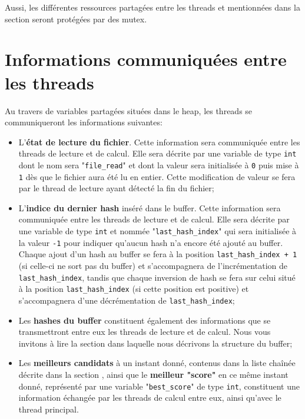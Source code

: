 \documentclass{article}
\begin{document}
	Aussi, les différentes ressources partagées entre les threads et mentionnées dans la section \textit{} seront protégées par des mutex.
 
\section{Informations communiquées entre les threads}
\label{sec:shared_data}
\noindent
	Au travers de variables partagées situées dans le heap, les threads se communiqueront les informations suivantes:
	
	\begin{itemize}
		\item
		L'\textbf{état de lecture du fichier}.
		Cette information sera communiquée entre les threads de lecture et de calcul.
		Elle sera décrite par une variable de type \lstinline{int} dont le nom sera "\lstinline{file_read}" et dont la valeur sera initialisée à \lstinline{0} puis mise à \lstinline{1} dès que le fichier aura été lu en entier.
		Cette modification de valeur se fera par le thread de lecture ayant détecté la fin du fichier;
		
		\item
		L'\textbf{indice du dernier hash} inséré dans le buffer.
		Cette information sera communiquée entre les threads de lecture et de calcul.
		Elle sera décrite par une variable de type \lstinline{int} et nommée "\lstinline{last_hash_index}" qui sera initialisée à la valeur \lstinline{-1} pour indiquer qu'aucun hash n'a encore été ajouté au buffer.
		Chaque ajout d'un hash au buffer se fera à la position \lstinline{last_hash_index + 1} (si celle-ci ne sort pas du buffer) et s'accompagnera de l'incrémentation de \lstinline{last_hash_index}, tandis que chaque inversion de hash se fera sur celui situé à la position \lstinline{last_hash_index} (si cette position est positive) et s'accompagnera d'une décrémentation de \lstinline{last_hash_index};
		
		\item 
		Les \textbf{hashes du buffer} constituent également des informations que se transmettront entre eux les threads de lecture et de calcul. Nous vous invitons à lire la section \textit{} dans laquelle nous décrivons la structure du buffer;
		
		\item
		Les \textbf{meilleurs candidats} à un instant donné, contenus dans la liste chaînée décrite dans la section \textit{}, ainsi que le \textbf{meilleur "score"} en ce même instant donné, représenté par une variable "\lstinline{best_score}" de type \lstinline{int}, constituent une information échangée par les threads de calcul entre eux, ainsi qu'avec le thread principal.
		
	\end{itemize}
\end{document}

